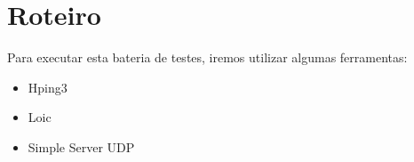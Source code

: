 \chapter[Roteiro]{Roteiro}

Para executar esta bateria de testes, iremos utilizar algumas ferramentas:

\begin{itemize}
    \item Hping3
    \item Loic
    \item Simple Server UDP
\end{itemize}
